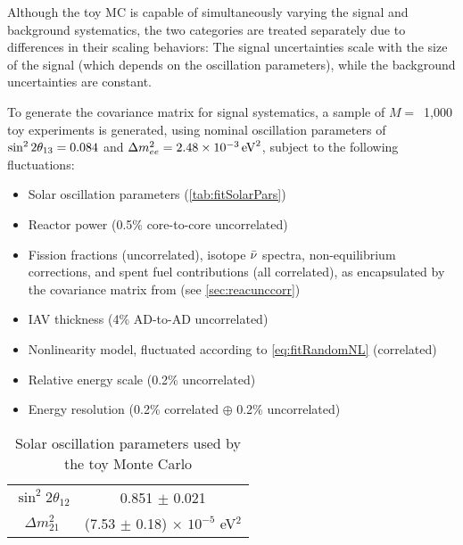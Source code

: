 \documentclass[../thesis.tex]{subfiles}
\begin{document}
Although the toy MC is capable of simultaneously varying the signal and background systematics, the two categories are treated separately due to differences in their scaling behaviors: The signal uncertainties scale with the size of the signal (which depends on the oscillation parameters), while the background uncertainties are constant.

To generate the covariance matrix for signal systematics, a sample of $M =$~1,000 toy experiments is generated, using nominal oscillation parameters of $\sin^2 2\theta_{13} = 0.084$ and $\Delta m^2_{ee} = \SI{2.48e-3}{eV^2}$, subject to the following fluctuations:

\begin{itemize}
\item Solar oscillation parameters (\autoref{tab:fitSolarPars})
\item Reactor power (0.5\% core-to-core uncorrelated)
\item Fission fractions (uncorrelated), isotope $\bar\nu$ spectra, non-equilibrium corrections, and spent fuel contributions (all correlated), as encapsulated by the covariance matrix from \cite{Lewis} (see \autoref{sec:reacunccorr})
\item IAV thickness (4\% AD-to-AD uncorrelated)
\item Nonlinearity model, fluctuated according to \autoref{eq:fitRandomNL} (correlated)
\item Relative energy scale (0.2\% uncorrelated)
\item Energy resolution (0.2\% correlated $\oplus$ 0.2\% uncorrelated)
\end{itemize}

\begin{table}[h]
  \centering
  \begin{tabular}{cc}
    \toprule
    $\sin^2 2\theta_{12}$ & 0.851 $\pm$ 0.021 \\
    $\Delta m^2_{21}$ & (7.53 $\pm$ 0.18) $\times$ $10^{-5}$ eV$^2$ \\
    \bottomrule
  \end{tabular}
  \caption{Solar oscillation parameters used by the toy Monte Carlo}
  \label{tab:fitSolarPars}
\end{table}
\end{document}

